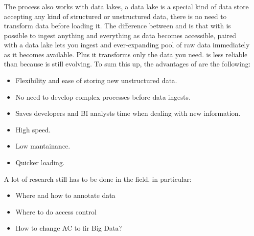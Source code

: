 \subsubsection{\elt}
The \elt process also works with data lakes, a data lake is a special kind of data store accepting any kind of structured or unstructured data, there is no need to transform data before loading it. \n
The difference between \etl and \elt is that with \elt is possible to ingest anything and everything as data becomes accessible, \elt paired with a data lake lets you ingest and ever-expanding pool of raw data immediately as it becomes available. Plus it transforms only the data you need. \n
\elt is less reliable than \etl because \elt is still evolving. \n
To sum this up, the advantages of \elt are the following:
\begin{itemize}
    \item Flexibility and ease of storing new unstructured data.
    \item No need to develop complex \etl processes before data ingests.
    \item Saves developers and BI analysts time when dealing with new information.
    \item High speed.
    \item Low mantainance.
    \item Quicker loading.
\end{itemize}
\smallSpace
A lot of research still has to be done in the field, in particular:
\begin{itemize}
    \item Where and how to annotate data
    \item Where to do access control
    \item How to change AC to fir Big Data?
\end{itemize}